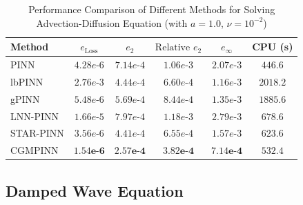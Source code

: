 \documentclass{article}
\theoremstyle{plain}
\theoremstyle{definition}
\theoremstyle{remark}
\begin{document}
\begin{table}[t]
	\centering
	\caption{Performance Comparison of Different Methods for Solving Advection-Diffusion Equation (with $a = 1.0$, $\nu = 10^{-2}$)}
	\label{tab:advection_diffusion_pinn_methods_performance}
	\begin{tabular}{lccccc}
		\toprule
		Method & $e_{\text{Loss}}$ & $e_2$ & $\text{Relative } e_2$ & $e_\infty$ & CPU (s) \\
		\midrule
		PINN               & $4.28e\text{-}6$ & $7.14e\text{-}4$ & $1.06e\text{-}3$ & $2.07e\text{-}3$ & $446.6$   \\
		lbPINN             & $2.76e\text{-}3$ & $4.44e\text{-}4$ & $6.60e\text{-}4$ & $1.16e\text{-}3$ & $2018.2$   \\
		gPINN              & $5.48e\text{-}6$ & $5.69e\text{-}4$ & $8.44e\text{-}4$ & $1.35e\text{-}3$ & $1885.6$   \\
		LNN-PINN           & $1.66e\text{-}5$ & $7.97e\text{-}4$ & $1.18e\text{-}3$ & $2.79e\text{-}3$ & $678.6$   \\
		STAR-PINN          & $3.56e\text{-}6$ & $4.41e\text{-}4$ & $6.55e\text{-}4$ & $1.57e\text{-}3$ & $623.6$   \\
		CGMPINN            & $\mathbf{1.54e\text{-}6}$ & $\mathbf{2.57e\text{-}4}$ & $\mathbf{3.82e\text{-}4}$ & $\mathbf{7.14e\text{-}4}$ & $532.4$   \\
		\bottomrule
	\end{tabular}
\end{table}

\subsection{Damped Wave Equation}
\label{subsec:damped_wave_equation}
\end{document}
